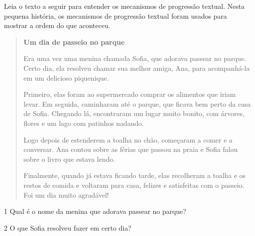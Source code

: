 

Leia o texto a seguir para entender os mecanismos de progressão textual.
Nesta pequena história, os mecanismos de progressão textual foram usados para
mostrar a ordem do que aconteceu.

\begin{quote}
\textbf{Um dia de passeio no parque}

Era uma vez uma menina chamada Sofia, que adorava passear no parque.
Certo dia, ela resolveu chamar sua melhor amiga, Ana, para
acompanhá-la em um delicioso piquenique.

Primeiro, elas foram ao supermercado comprar os alimentos que iriam
levar. Em seguida, caminharam até o parque, que ficava bem perto da casa
de Sofia. Chegando lá, encontraram um lugar muito bonito, com árvores,
flores e um lago com patinhos nadando.

Logo depois de estenderem a toalha no chão, começaram a comer e a
conversar. Ana contou sobre as férias que passou na praia e Sofia
falou sobre o livro que estava lendo.

Finalmente, quando já estava ficando tarde, elas recolheram a toalha e
os restos de comida e voltaram para casa, felizes e satisfeitas com o
passeio. Foi um dia muito agradável!

\end{quote}


\num{1} Qual é o nome da menina que adorava passear no parque?


\num{2} O que Sofia resolveu fazer em certo dia?


